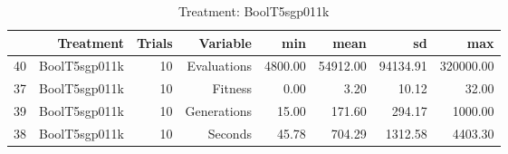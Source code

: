 \begin{table}[ht]
\centering
\begin{tabular}{rrrrrrrr}
  \hline
 & Treatment & Trials & Variable & min & mean & sd & max \\ 
  \hline
40 & BoolT5sgp011k &  10 & Evaluations & 4800.00 & 54912.00 & 94134.91 & 320000.00 \\ 
  37 & BoolT5sgp011k &  10 & Fitness & 0.00 & 3.20 & 10.12 & 32.00 \\ 
  39 & BoolT5sgp011k &  10 & Generations & 15.00 & 171.60 & 294.17 & 1000.00 \\ 
  38 & BoolT5sgp011k &  10 & Seconds & 45.78 & 704.29 & 1312.58 & 4403.30 \\ 
   \hline
\end{tabular}
\caption{Treatment: BoolT5sgp011k} 
\end{table}
